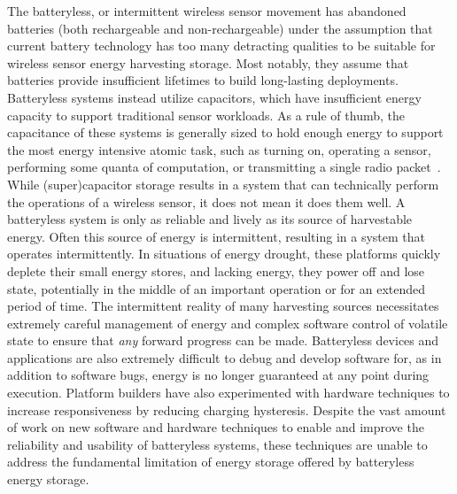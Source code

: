 The batteryless, or intermittent wireless sensor movement has abandoned batteries (both rechargeable and non-rechargeable) under the assumption that current battery technology has too many detracting qualities to be suitable for wireless sensor energy harvesting storage. Most notably, they assume that batteries provide insufficient lifetimes to build long-lasting deployments.
Batteryless systems instead utilize capacitors, which have insufficient energy capacity to support traditional sensor workloads.
As a rule of thumb, the capacitance of these systems is generally sized to hold enough energy to support the most energy intensive atomic task, such as turning on, operating a sensor, performing some quanta of computation, or transmitting a single radio packet~\cite{nardello2019camaroptera,colinReconfigurable18, shukla2019skinnypower, hesterFlicker17}.
While (super)capacitor storage results in a system that can technically perform the operations of a wireless sensor, it does not mean it does them well.
A batteryless system is only as reliable and lively as its source of harvestable energy.
Often this source of energy is intermittent, resulting in a system that operates intermittently.
In situations of energy drought,
these platforms quickly deplete their
small energy stores, and lacking energy,
they power off and lose
state, potentially in the middle of an important operation or for an extended period of time.
The intermittent reality of many harvesting sources necessitates extremely careful management of energy and complex software control of volatile state to ensure that \textit{any} forward progress can be made.
Batteryless devices and applications are also extremely difficult to debug and develop software for, as in addition to software bugs, energy is no longer guaranteed at any point during execution.
Platform builders have also experimented with hardware techniques to increase responsiveness by reducing charging hysteresis.
Despite the vast amount of work on new software and hardware techniques to enable and improve the reliability and usability of batteryless systems, these techniques are unable to address the fundamental limitation of energy storage offered by batteryless energy storage.


